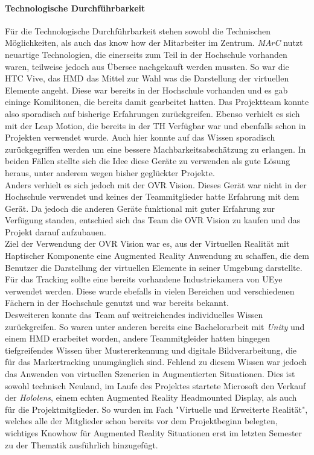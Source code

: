 \paragraph{Technologische Durchführbarkeit} Für die Technologische Durchführbarkeit stehen sowohl die Technischen Möglichkeiten, als auch das know how der Mitarbeiter im Zentrum. \textit{MArC} nutzt neuartige Technologien, die einerseits zum Teil in der Hochschule vorhanden waren, teilweise jedoch aus Übersee nachgekauft werden mussten. So war die HTC Vive, das HMD das Mittel zur Wahl was die Darstellung der virtuellen Elemente angeht. Diese war bereits in der Hochschule vorhanden und es gab eininge Komilitonen, die bereits damit gearbeitet hatten. Das Projektteam konnte also sporadisch auf bisherige Erfahrungen zurückgreifen. Ebenso verhielt es sich mit der Leap Motion, die bereits in der TH Verfügbar war und ebenfalls schon in Projekten verwendet wurde. Auch hier konnte auf das Wissen sporadisch zurückgegriffen werden um eine bessere Machbarkeitsabschätzung zu erlangen. In beiden Fällen stellte sich die Idee diese Geräte zu verwenden als gute Lösung heraus, unter anderem wegen bisher geglückter Projekte.\\
Anders verhielt es sich jedoch mit der OVR Vision. Dieses Gerät war nicht in der Hochschule verwendet und keines der Teammitglieder hatte Erfahrung mit dem Gerät. Da jedoch die anderen Geräte funktional mit guter Erfahrung zur Verfügung standen, entschied sich das Team die OVR Vision zu kaufen und das Projekt darauf aufzubauen.\\
Ziel der Verwendung der OVR Vision war es, aus der Virtuellen Realität mit Haptischer Komponente eine Augmented Reality Anwendung zu schaffen, die dem Benutzer die Darstellung der virtuellen Elemente in seiner Umgebung darstellte.\\
Für das Tracking sollte eine bereits vorhandene Industriekamera von UEye verwendet werden. Diese wurde ebefalls in vielen Bereichen und verschiedenen Fächern in der Hochschule genutzt und war bereits bekannt.\\
Desweiteren konnte das Team auf weitreichendes individuelles Wissen zurückgreifen. So waren unter anderen bereits eine Bachelorarbeit mit \textit{Unity} und einem HMD erarbeitet worden, andere Teammitgleider hatten hingegen tiefgreifendes Wissen über Mustererkennung und digitale Bildverarbeitung, die für das Markertracking unumgänglich sind. Fehlend zu diesem Wissen war jedoch das Anwenden von virtuellen Szenerien in Augmentierten Situationen. Dies ist sowohl technisch Neuland, im Laufe des Projektes startete Microsoft den Verkauf der \textit{Hololens}, einem echten Augmented Reality Headmounted Display, als auch für die Projektmitglieder. So wurden im Fach "Virtuelle und Erweiterte Realität", welches alle der Mitglieder schon bereits vor dem Projektbeginn belegten, wichtiges Knowhow für Augmented Reality Situationen erst im letzten Semester zu der Thematik ausführlich hinzugefügt.

